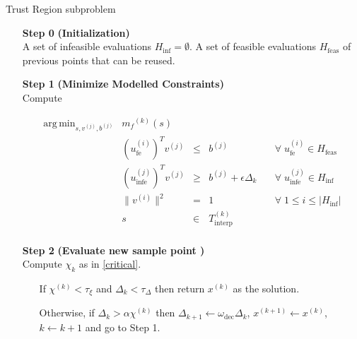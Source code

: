 \documentclass{article}
\theoremstyle{case}
\newcommand{\modelk}{{{m}_f}^{(k)}}
\newcommand{\iteratek}{{x}^{(k)}}
\newcommand{\sampletrk}{{T_{\text{interp}}^{(k)}}}
\newcommand{\chik}{{\chi^{(k)}}}
\newcommand{\omegadec}{\omega_{\text{dec}}}
\newcommand{\dk}{\Delta_k}
\DeclareMathOperator*{\argmin}{arg\,min}
\begin{document}
\begin{algorithm}[H]
    \caption{Trust Region subproblem}
    \label{constrained_dfo}
    \begin{itemize}
        \item[\textbf{Step 0}] \textbf{(Initialization)} \\
            A set of infeasible evaluations $H_{\text{inf}} = \emptyset$.
            A set of feasible evaluations $H_{\text{feas}}$ of previous points that can be reused.
            
        \item[\textbf{Step 1}] \textbf{(Minimize Modelled Constraints)} \\
            Compute
            
\begin{displaymath}
\begin{array}{cccccc}
\argmin_{s, v^{(j)}, b^{(j)}}	& \modelk(s) 	                         &       &                            				& 	\\
							& \left(u_{\text{fe}}^{(i)}\right)^T v^{(j)}     & \le   & b^{(j)}                     		& \quad \forall \; u_{\text{fe}}^{(i)} \in H_{\text{feas}}	\\
							& \left(u_{\text{infe}}^{(j)}\right)^T v^{(j)}      & \ge   & b^{(j)} + \epsilon \Delta_k   & \quad \forall \; u_{\text{infe}}^{(j)} \in H_{\text{inf}}  \\
							& \|v^{(i)}\|^2   & =     & 1                           									& \quad \forall \; 1 \le i \le |  H_{\text{inf}} | \\
							& s          & \in   & \sampletrk    														&	\\
\end{array}
\end{displaymath}
           
        \item[\textbf{Step 2}] \textbf{(Evaluate new sample point )} \\
            Compute $\chi_k$ as in \cref{critical}. \begin{itemize}
                \item[] If $ \chik < \tau_{\xi} $ and $\dk <\tau_{\Delta}$ then return $\iteratek$ as the solution.
                \item[] Otherwise, if $\dk > \alpha \chik$ then 
                $\Delta_{k+1} \gets \omegadec \Delta_{k}$, 
                $x^{(k+1)} \gets \iteratek$,
                $k \gets k+1$ and go to Step 1.
            \end{itemize}
        

\end{itemize}
\end{algorithm}
\end{document}
